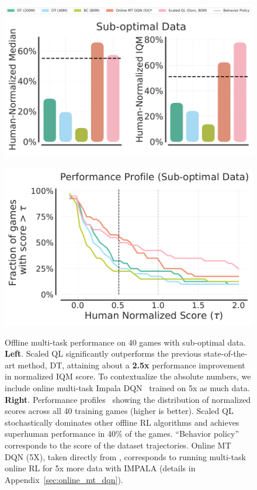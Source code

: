\documentclass[../thesis.tex]{subfiles}
\begin{document}
\vspace{-0.1cm}
\begin{figure}[t]
    \centering
    \includegraphics[width=0.95\linewidth]{chapters/scaled_ql/figures/training_fig_legend_20p.pdf}
    \vspace{-0.1cm}
    \includegraphics[width=0.48\linewidth]{chapters/scaled_ql/figures/suboptimal_data_results.pdf}
    ~~~
    \includegraphics[width=0.45\linewidth]{chapters/scaled_ql/figures/perf_profile_20p.pdf}
    \vspace{-0.3cm}
    \caption{\footnotesize{Offline multi-task performance on 40 games with sub-optimal data. \textbf{Left}. Scaled QL significantly outperforms the previous state-of-the-art method, DT, attaining about a \textbf{2.5x} performance improvement in normalized IQM score. To contextualize the absolute numbers, we include online multi-task Impala DQN~\citep{espeholt2018impala} trained on 5x as much data.
    \textbf{Right}. Performance profiles~\citep{agarwal2021deep} showing the distribution of normalized scores across all 40 training games (higher is better). 
    Scaled QL stochastically dominates other offline RL algorithms and achieves superhuman performance in 40\% of the games. ``Behavior policy'' corresponds to the score of the dataset trajectories. {Online MT DQN (5X), taken directly from \citet{lee2022multi}, corresponds to running multi-task online RL for 5x more data with IMPALA (details in Appendix~\ref{sec:online_mt_dqn}).}}}
    \label{fig:suboptimal_offline}
    \vspace{-0.3cm}
\end{figure}






\end{document}
